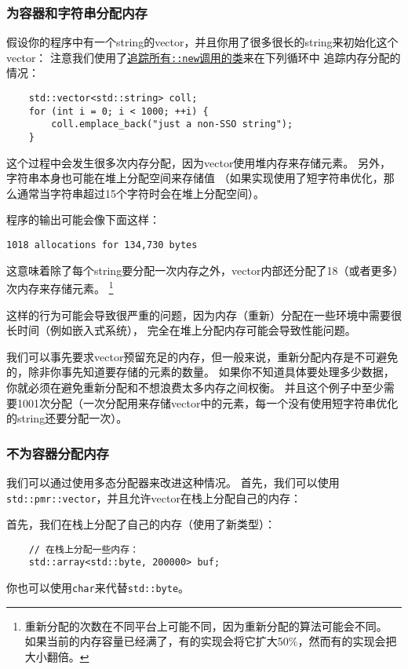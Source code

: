 \subsubsection{为容器和字符串分配内存}\label{ch29.1.1.1}
假设你的程序中有一个string的vector，并且你用了很多很长的string来初始化这个vector：
注意我们使用了\hyperref[ch30.4]{追踪所有\texttt{::new}调用的类}来在下列循环中
追踪内存分配的情况：
\begin{lstlisting}
    std::vector<std::string> coll;
    for (int i = 0; i < 1000; ++i) {
        coll.emplace_back("just a non-SSO string");
    }
\end{lstlisting}
这个过程中会发生很多次内存分配，因为vector使用堆内存来存储元素。
另外，字符串本身也可能在堆上分配空间来存储值
（如果实现使用了短字符串优化，那么通常当字符串超过15个字符时会在堆上分配空间）。

程序的输出可能会像下面这样：
\begin{lstlisting}[keywordstyle=\color{black}]
    1018 allocations for 134,730 bytes
\end{lstlisting}
这意味着除了每个string要分配一次内存之外，vector内部还分配了18（或者更多）次内存来存储元素。
\footnote{重新分配的次数在不同平台上可能不同，因为重新分配的算法可能会不同。
如果当前的内存容量已经满了，有的实现会将它扩大50\%，然而有的实现会把大小翻倍。}

这样的行为可能会导致很严重的问题，因为内存（重新）分配在一些环境中需要很长时间（例如嵌入式系统），
完全在堆上分配内存可能会导致性能问题。

我们可以事先要求vector预留充足的内存，但一般来说，重新分配内存是不可避免的，除非你事先知道要存储的元素的数量。
如果你不知道具体要处理多少数据，你就必须在避免重新分配和不想浪费太多内存之间权衡。
并且这个例子中至少需要1001次分配（一次分配用来存储vector中的元素，每一个没有使用短字符串优化的string还要分配一次）。

\subsubsection{不为容器分配内存}
我们可以通过使用多态分配器来改进这种情况。
首先，我们可以使用\texttt{std::pmr::vector}，并且允许vector在栈上分配自己的内存：

首先，我们在栈上分配了自己的内存（使用了新类型）：
\begin{lstlisting}
    // 在栈上分配一些内存：
    std::array<std::byte, 200000> buf;
\end{lstlisting}
你也可以使用\texttt{char}来代替\texttt{std::byte}。

